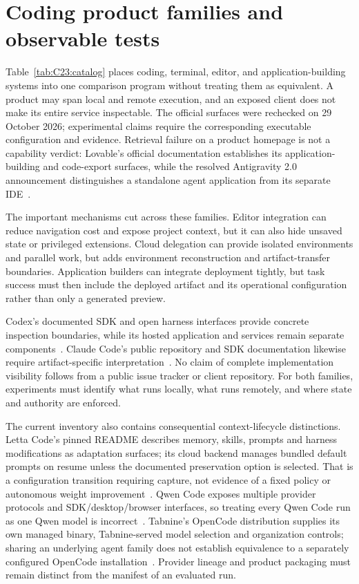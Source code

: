 \section{Coding product families and observable tests}\label{sec:C23:catalog}
Table~\ref{tab:C23:catalog} places coding, terminal, editor, and application-building systems into one comparison program without treating them as equivalent. A product may span local and remote execution, and an exposed client does not make its entire service inspectable. The official surfaces were rechecked on 29 October 2026; experimental claims require the corresponding executable configuration and evidence. Retrieval failure on a product homepage is not a capability verdict: Lovable's official documentation establishes its application-building and code-export surfaces, while the resolved Antigravity 2.0 announcement distinguishes a standalone agent application from its separate IDE~\cite{cumb2026lovable,cumb2026antigravity2}.


The important mechanisms cut across these families. Editor integration can reduce navigation cost and expose project context, but it can also hide unsaved state or privileged extensions. Cloud delegation can provide isolated environments and parallel work, but adds environment reconstruction and artifact-transfer boundaries. Application builders can integrate deployment tightly, but task success must then include the deployed artifact and its operational configuration rather than only a generated preview.

Codex's documented SDK and open harness interfaces provide concrete inspection boundaries, while its hosted application and services remain separate components~\cite{executionproduct005}. Claude Code's public repository and SDK documentation likewise require artifact-specific interpretation~\cite{executionproduct021,executionproduct020}. No claim of complete implementation visibility follows from a public issue tracker or client repository. For both families, experiments must identify what runs locally, what runs remotely, and where state and authority are enforced.

The current inventory also contains consequential context-lifecycle distinctions. Letta Code's pinned README describes memory, skills, prompts and harness modifications as adaptation surfaces; its cloud backend manages bundled default prompts on resume unless the documented preservation option is selected. That is a configuration transition requiring capture, not evidence of a fixed policy or autonomous weight improvement~\cite{cumb2026lettacode}. Qwen Code exposes multiple provider protocols and SDK/desktop/browser interfaces, so treating every Qwen Code run as one Qwen model is incorrect~\cite{cumb2026qwencode}. Tabnine's OpenCode distribution supplies its own managed binary, Tabnine-served model selection and organization controls; sharing an underlying agent family does not establish equivalence to a separately configured OpenCode installation~\cite{cumb2026tabnineopencode}. Provider lineage and product packaging must remain distinct from the manifest of an evaluated run.

